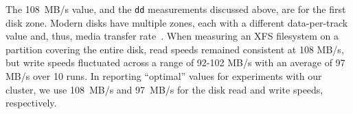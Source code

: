 
%


The 108~MB/s value, and the \texttt{dd} measurements discussed above,
are for the first disk zone.
Modern disks have multiple zones, each with a different
data-per-track value and, thus, media transfer rate~\cite{Schindler02local}.
When measuring an XFS filesystem on a partition covering the entire disk,
read speeds remained consistent at 108 MB/s, but write speeds fluctuated
across a range of 92-102 MB/s with an average of 97 MB/s over 10 runs.
In reporting ``optimal'' values for experiments with our cluster, we
use 108~MB/s and 97~MB/s for the disk read and write speeds, respectively.




